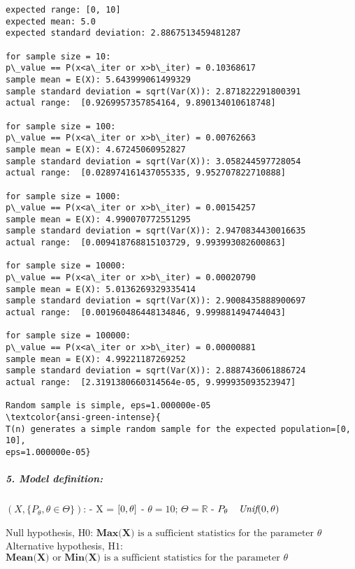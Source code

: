 \documentclass[11pt]{article}
\begin{document}
    \begin{Verbatim}[commandchars=\\\{\}]
expected range: [0, 10]
expected mean: 5.0
expected standard deviation: 2.8867513459481287

for sample size = 10:
p\_value == P(x<a\_iter or x>b\_iter) = 0.10368617
sample mean = E(X): 5.643999061499329
sample standard deviation = sqrt(Var(X)): 2.871822291800391
actual range:  [0.9269957357854164, 9.890134010618748]

for sample size = 100:
p\_value == P(x<a\_iter or x>b\_iter) = 0.00762663
sample mean = E(X): 4.67245060952827
sample standard deviation = sqrt(Var(X)): 3.058244597728054
actual range:  [0.028974161437055335, 9.952707822710888]

for sample size = 1000:
p\_value == P(x<a\_iter or x>b\_iter) = 0.00154257
sample mean = E(X): 4.990070772551295
sample standard deviation = sqrt(Var(X)): 2.9470834430016635
actual range:  [0.009418768815103729, 9.993993082600863]

for sample size = 10000:
p\_value == P(x<a\_iter or x>b\_iter) = 0.00020790
sample mean = E(X): 5.0136269329335414
sample standard deviation = sqrt(Var(X)): 2.9008435888900697
actual range:  [0.001960486448134846, 9.999881494744043]

for sample size = 100000:
p\_value == P(x<a\_iter or x>b\_iter) = 0.00000881
sample mean = E(X): 4.99221187269252
sample standard deviation = sqrt(Var(X)): 2.8887436061886724
actual range:  [2.3191380660314564e-05, 9.999935093523947]

Random sample is simple, eps=1.000000e-05
\textcolor{ansi-green-intense}{
T(n) generates a simple random sample for the expected population=[0, 10],
eps=1.000000e-05}
    \end{Verbatim}

    \vspace{190px}
    \hypertarget{model-definition}{%
\subparagraph{5. Model definition:}\label{model-definition}}

 \((X,\{P_{\theta}, \theta \in \Theta\})\): \newline
- X = \([ 0,\space \theta]\) \newline
- \(\theta = 10\); \(\Theta = \mathbb{R}\) \newline
- \(P_{\theta} \textit{ ~ Unif}\space(0, \theta)\) \newline

Null hypothesis, \(\text{H0}\):
\(\textbf{Max(X)}\text{ is a sufficient statistics for the parameter }\theta\)\newline\newline
Alternative hypothesis, \(\text{H1}\):
\(\textbf{Mean(X)}\text{ or }\textbf{Min(X)}\text{ is a sufficient statistics for the parameter }\theta\)
\end{document}
